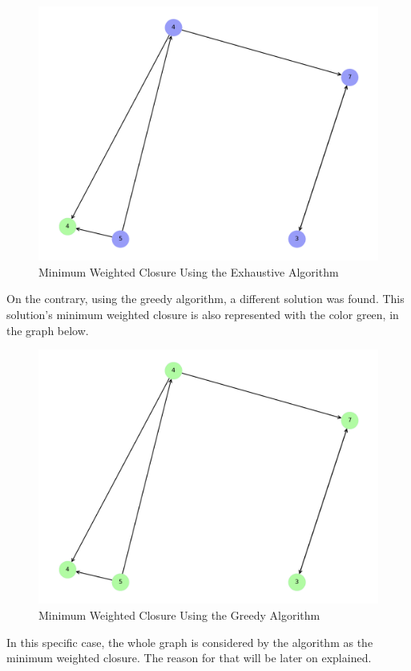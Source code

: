 \documentclass[...]{revdetua}
\begin{document}
\begin{figure}[!htb]
    \centering
    \includegraphics[width=0.75\columnwidth]{./figures/simple_graph_exhaustive_solution.png}
    \caption{Minimum Weighted Closure Using the Exhaustive Algorithm}
    \label{fig: Minimum Weighted Closure Using the Exhaustive Algorithm}
\end{figure}

On the contrary, using the greedy algorithm, a different solution was found. This solution's minimum weighted closure is also represented with the color green, in the graph below.

\begin{figure}[!htb]
    \centering
    \includegraphics[width=0.75\columnwidth]{./figures/simple_graph_greedy_solution.png}
    \caption{Minimum Weighted Closure Using the Greedy Algorithm}
    \label{fig: Minimum Weighted Closure Using the Greedy Algorithm}
\end{figure}

\newpage

In this specific case, the whole graph is considered by the algorithm as the minimum weighted closure. The reason for that will be later on explained.
\end{document}
